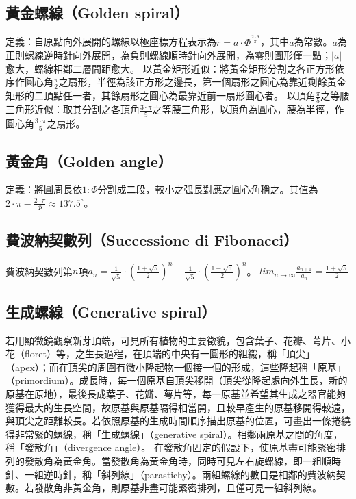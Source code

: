 \documentclass[a4paper,12pt]{article}
\begin{document}
\subsection{黃金螺線（Golden spiral）}
定義：自原點向外展開的螺線以極座標方程表示為\(r=a\cdot\Phi^{\frac{2\cdot\theta}{\pi}}\)，其中\(a\)為常數。\(a\)為正則螺線逆時針向外展開，為負則螺線順時針向外展開，為零則圖形僅一點；\(|a|\)愈大，螺線相鄰二層間距愈大。\newline
以黃金矩形近似：將黃金矩形分割之各正方形依序作圓心角\(\frac{\pi}{2}\)之扇形，半徑為該正方形之邊長，第一個扇形之圓心為靠近剩餘黃金矩形的二頂點任一者，其餘扇形之圓心為最靠近前一扇形圓心者。\newline
以頂角\(\frac{\pi}{5}\)之等腰三角形近似：取其分割之各頂角\(\frac{3\cdot\pi}{5}\)之等腰三角形，以頂角為圓心，腰為半徑，作圓心角\(\frac{3\cdot\pi}{5}\)之扇形。
\subsection{黃金角（Golden angle）}
定義：將圓周長依\(1:\Phi\)分割成二段，較小之弧長對應之圓心角稱之。其值為\(2\cdot\pi-\frac{2\cdot\pi}{\Phi}\approx137.5^\circ\)。
\subsection{費波納契數列（Successione di Fibonacci）}
費波納契數列第\(n\)項\(a_n=\frac{1}{\sqrt{5}}\cdot(\frac{1+\sqrt{5}}{2})^n-\frac{1}{\sqrt{5}}\cdot(\frac{1-\sqrt{5}}{2})^n\)。\newline
\(lim_{n\to\infty}\frac{a_{n+1}}{a_n}=\frac{1+\sqrt{5}}{2}\)
\subsection{生成螺線（Generative spiral）}
若用顯微鏡觀察新芽頂端，可見所有植物的主要徵貌，包含葉子、花瓣、萼片、小花（floret）等，之生長過程，在頂端的中央有一圓形的組織，稱「頂尖」（apex）；而在頂尖的周圍有微小隆起物一個接一個的形成，這些隆起稱「原基」（primordium）。成長時，每一個原基自頂尖移開（頂尖從隆起處向外生長，新的原基在原地），最後長成葉子、花瓣、萼片等，每一原基並希望其生成之器官能夠獲得最大的生長空間，故原基與原基隔得相當開，且較早產生的原基移開得較遠，與頂尖之距離較長。若依照原基的生成時間順序描出原基的位置，可畫出一條捲繞得非常緊的螺線，稱「生成螺線」（generative spiral）。相鄰兩原基之間的角度，稱「發散角」（divergence angle）。 在發散角固定的假設下，使原基盡可能緊密排列的發散角為黃金角。當發散角為黃金角時，同時可見左右旋螺線，即一組順時針、一組逆時針，稱「斜列線」（parastichy）。兩組螺線的數目是相鄰的費波納契數。若發散角非黃金角，則原基非盡可能緊密排列，且僅可見一組斜列線。
\end{document}
